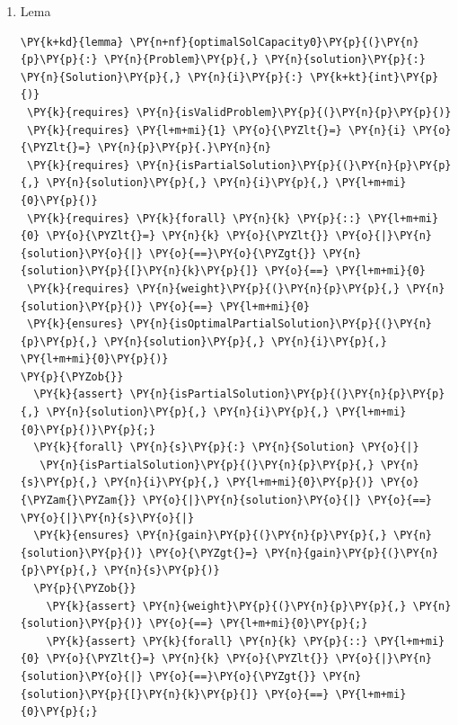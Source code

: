 \begin{sloppypar}
\begin{enumerate}
\begin{Verbatim}[commandchars=\\\{\}]
    \PY{k}{assert} \PY{n}{computeGain}\PY{p}{(}\PY{n}{p}\PY{p}{,} \PY{n}{solution}\PY{p}{,} \PY{n}{i}\PY{p}{)} \PY{o}{==} \PY{l+m+mi}{0}\PY{p}{;}
  \PY{p}{\PYZcb{}}
\PY{p}{\PYZcb{}}
\end{Verbatim}
    \hspace{2mm} Această lemă este demonstrată prin inducție și folosită pentru a arăta că dacă avem o soluție ce conține doar elemente de 0, atunci câștigul produs de o astfel de soluție nu poate fi decât 0. 
    \item Lema 
    \begin{Verbatim}[commandchars=\\\{\}]
\PY{k+kd}{lemma} \PY{n+nf}{optimalSolCapacity0}\PY{p}{(}\PY{n}{p}\PY{p}{:} \PY{n}{Problem}\PY{p}{,} \PY{n}{solution}\PY{p}{:} \PY{n}{Solution}\PY{p}{,} \PY{n}{i}\PY{p}{:} \PY{k+kt}{int}\PY{p}{)}
 \PY{k}{requires} \PY{n}{isValidProblem}\PY{p}{(}\PY{n}{p}\PY{p}{)}
 \PY{k}{requires} \PY{l+m+mi}{1} \PY{o}{\PYZlt{}=} \PY{n}{i} \PY{o}{\PYZlt{}=} \PY{n}{p}\PY{p}{.}\PY{n}{n}
 \PY{k}{requires} \PY{n}{isPartialSolution}\PY{p}{(}\PY{n}{p}\PY{p}{,} \PY{n}{solution}\PY{p}{,} \PY{n}{i}\PY{p}{,} \PY{l+m+mi}{0}\PY{p}{)}
 \PY{k}{requires} \PY{k}{forall} \PY{n}{k} \PY{p}{::} \PY{l+m+mi}{0} \PY{o}{\PYZlt{}=} \PY{n}{k} \PY{o}{\PYZlt{}} \PY{o}{|}\PY{n}{solution}\PY{o}{|} \PY{o}{==}\PY{o}{\PYZgt{}} \PY{n}{solution}\PY{p}{[}\PY{n}{k}\PY{p}{]} \PY{o}{==} \PY{l+m+mi}{0}
 \PY{k}{requires} \PY{n}{weight}\PY{p}{(}\PY{n}{p}\PY{p}{,} \PY{n}{solution}\PY{p}{)} \PY{o}{==} \PY{l+m+mi}{0}
 \PY{k}{ensures} \PY{n}{isOptimalPartialSolution}\PY{p}{(}\PY{n}{p}\PY{p}{,} \PY{n}{solution}\PY{p}{,} \PY{n}{i}\PY{p}{,} \PY{l+m+mi}{0}\PY{p}{)}
\PY{p}{\PYZob{}}
  \PY{k}{assert} \PY{n}{isPartialSolution}\PY{p}{(}\PY{n}{p}\PY{p}{,} \PY{n}{solution}\PY{p}{,} \PY{n}{i}\PY{p}{,} \PY{l+m+mi}{0}\PY{p}{)}\PY{p}{;}
  \PY{k}{forall} \PY{n}{s}\PY{p}{:} \PY{n}{Solution} \PY{o}{|} 
   \PY{n}{isPartialSolution}\PY{p}{(}\PY{n}{p}\PY{p}{,} \PY{n}{s}\PY{p}{,} \PY{n}{i}\PY{p}{,} \PY{l+m+mi}{0}\PY{p}{)} \PY{o}{\PYZam{}\PYZam{}} \PY{o}{|}\PY{n}{solution}\PY{o}{|} \PY{o}{==} \PY{o}{|}\PY{n}{s}\PY{o}{|}
  \PY{k}{ensures} \PY{n}{gain}\PY{p}{(}\PY{n}{p}\PY{p}{,} \PY{n}{solution}\PY{p}{)} \PY{o}{\PYZgt{}=} \PY{n}{gain}\PY{p}{(}\PY{n}{p}\PY{p}{,} \PY{n}{s}\PY{p}{)}
  \PY{p}{\PYZob{}}
    \PY{k}{assert} \PY{n}{weight}\PY{p}{(}\PY{n}{p}\PY{p}{,} \PY{n}{solution}\PY{p}{)} \PY{o}{==} \PY{l+m+mi}{0}\PY{p}{;}
    \PY{k}{assert} \PY{k}{forall} \PY{n}{k} \PY{p}{::} \PY{l+m+mi}{0} \PY{o}{\PYZlt{}=} \PY{n}{k} \PY{o}{\PYZlt{}} \PY{o}{|}\PY{n}{solution}\PY{o}{|} \PY{o}{==}\PY{o}{\PYZgt{}} \PY{n}{solution}\PY{p}{[}\PY{n}{k}\PY{p}{]} \PY{o}{==} \PY{l+m+mi}{0}\PY{p}{;}

\end{Verbatim}
\end{enumerate}
\end{sloppypar}
